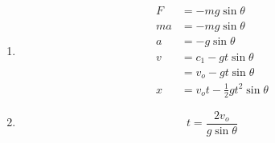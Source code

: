 \documentclass{article}
\begin{document}
\setcounter{subsection}{36}
\subsection{}

\begin{enumerate}
  \item

        \begin{align*}
          F   & = -m g \sin \theta                      \\
          m a & = -m g \sin \theta                      \\
          a   & = -g \sin \theta                        \\
          v   & = c_1 - g t \sin \theta                 \\
              & = v_o - g t \sin \theta                 \\
          x   & = v_o t - \frac{1}{2} g t^2 \sin \theta
        \end{align*}

  \item \[t = \frac{2 v_o}{g \sin \theta}\]
\end{enumerate}

\setcounter{subsection}{38}
\subsection{}
\end{document}
